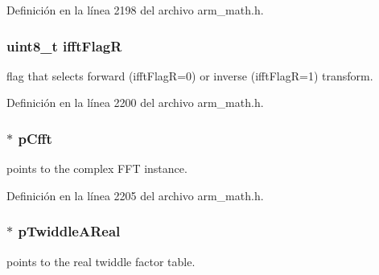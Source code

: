 Definición en la línea 2198 del archivo arm\+\_\+math.\+h.

\subsubsection[{\texorpdfstring{ifft\+FlagR}{ifftFlagR}}]{\setlength{\rightskip}{0pt plus 5cm}uint8\+\_\+t ifft\+FlagR}\hypertarget{structarm__rfft__instance__f32_a787d72055c89e4d62b188d6bd646341c}{}\label{structarm__rfft__instance__f32_a787d72055c89e4d62b188d6bd646341c}
flag that selects forward (ifft\+FlagR=0) or inverse (ifft\+FlagR=1) transform. 

Definición en la línea 2200 del archivo arm\+\_\+math.\+h.

\subsubsection[{\texorpdfstring{p\+Cfft}{pCfft}}]{$\ast$ p\+Cfft}\hypertarget{structarm__rfft__instance__f32_ab7bd4d374a1780dea50efd3e7ac220be}{}\label{structarm__rfft__instance__f32_ab7bd4d374a1780dea50efd3e7ac220be}
points to the complex F\+FT instance. 

Definición en la línea 2205 del archivo arm\+\_\+math.\+h.

\subsubsection[{\texorpdfstring{p\+Twiddle\+A\+Real}{pTwiddleAReal}}]{$\ast$ p\+Twiddle\+A\+Real}\hypertarget{structarm__rfft__instance__f32_a1fb731395d060f9999c91c242b3e8a61}{}\label{structarm__rfft__instance__f32_a1fb731395d060f9999c91c242b3e8a61}
points to the real twiddle factor table. 

